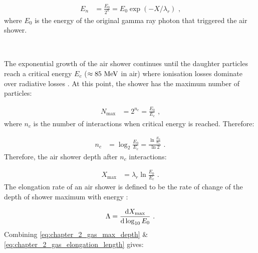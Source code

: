 \begin{equation}
    \begin{aligned}
    E_n&=\frac{E_0}{2^n}=E_0\exp(-X/\lambda_r)\text{ ,}
    \end{aligned}
\end{equation}
\noindent where $E_0$ is the energy of the original gamma ray photon that triggered the air shower.
\par~\par 
The exponential growth of the air shower continues until the daughter particles reach a critical energy $E_c$ ($\approx 85~\si{\mega\electronvolt}$ in air) where ionisation losses dominate over radiative losses \citep{1954qtr..book.....H}. At this point, the shower has the maximum number of particles:

\begin{equation}
    \begin{aligned}
    N_\text{max}&=2^{n_c} = \frac{E_0}{E_c}\text{ ,}
    \end{aligned} \label{eq:chapter_1_gas_max_particles} 
\end{equation}
\noindent where $n_c$ is the number of interactions when critical energy is reached. Therefore:

\begin{equation}
    \begin{aligned}
    n_c&=\log_2 \frac{E_0}{E_c} =\frac{\ln{\frac{E_0}{E_c}}}{\ln 2}\text{ .}
    \end{aligned} \label{eq:chapter_2_gas_max_interactions}
\end{equation}
\noindent Therefore, the air shower depth after $n_c$ interactions:

\begin{equation}
    \begin{aligned}
    X_\text{max}&=\lambda_r \ln\frac{E_0}{E_c}\text{ .}
    \end{aligned} \label{eq:chapter_2_gas_max_depth}
\end{equation}
\noindent The elongation rate of an air shower is defined to be the rate of change of the depth of shower maximum with energy \citep{MATTHEWS2005387}:

\begin{equation}
    \begin{aligned}
    \Lambda=\dv{X_\text{max}}{\log_{10}E_0} \text{ .}
    \end{aligned} \label{eq:chapter_2_gas_elongation_length}
\end{equation}
\noindent Combining \autoref{eq:chapter_2_gas_max_depth} \& \ref{eq:chapter_2_gas_elongation_length} gives:


